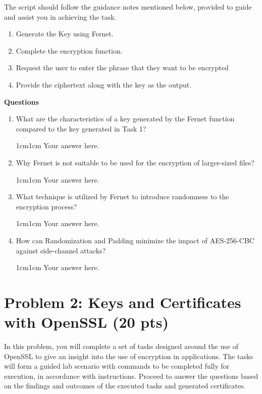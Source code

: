\documentclass[11pt,letterpaper]{article}
\newenvironment{answer}{\em \color{blue} \begin{adjustwidth}{1cm}{1cm}}{\end{adjustwidth}}
\begin{document}
\medskip
The script should follow the guidance notes mentioned below, provided to guide and assist you in achieving the task.

\begin{enumerate}
    \item Generate the Key using Fernet.
    \item Complete the encryption function.
    \item Request the user to enter the phrase that they want to be encrypted
    \item Provide the ciphertext along with the key as the output.
\end{enumerate}

\noindent \textbf{Questions}
\medskip
\begin{enumerate}
    \item What are the characteristics of a key generated by the Fernet function compared to the key generated in Task 1?
    \begin{answer}
		Your answer here.
	\end{answer}
    \item Why Fernet is not suitable to be used for the encryption of larger-sized files?
    \begin{answer}
		Your answer here.
	\end{answer}
    \item What technique is utilized by Fernet to introduce randomness to the encryption process?
    \begin{answer}
		Your answer here.
	\end{answer}
    \item How can Randomization and Padding minimize the impact of AES-256-CBC against side-channel attacks?
    \begin{answer}
		Your answer here.
	\end{answer}

\end{enumerate}


\newpage
\section*{Problem 2: Keys and Certificates with OpenSSL ({20 pts})}

In this problem, you will complete a set of tasks designed around the use of OpenSSL to give an insight into the use of encryption in applications. The tasks will form a guided lab scenario with commands to be completed fully for execution, in accordance with instructions. Proceed to answer the questions based on the findings and outcomes of the executed tasks and generated certificates.
\end{document}
